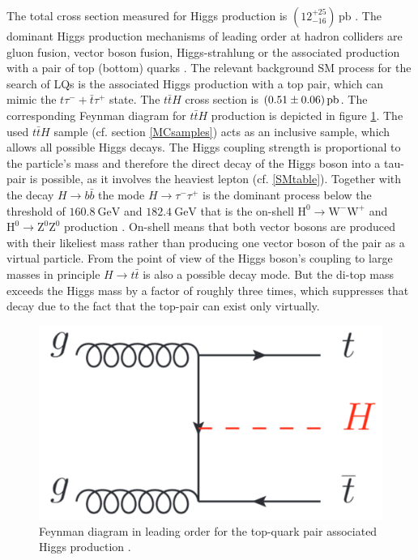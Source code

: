 The total cross section measured for Higgs production is $\left( 12^{+25}_{-16} \right)\,\text{pb}$ \cite{HiggsCrossSection}. The dominant Higgs production mechanisms of leading order at hadron colliders are gluon fusion, vector boson fusion, Higgs-strahlung or the associated production with a pair of top (bottom) quarks \cite{PhysRevD}. The relevant background SM process for the search of LQs is the associated Higgs production with a top pair, which can mimic the $t\tau^{-}+\bar{t}\tau^{+}$ state. The $t\bar{t}H$ cross section is $\SI{0.51\pm0.06}{\pico\barn}$. The corresponding Feynman diagram for $t\bar{t}H$ production is depicted in figure \ref{ttHproduction}. The used $t\bar{t}H$ sample (cf. section \ref{MCsamples}) acts as an inclusive sample, which allows all possible Higgs decays. The Higgs coupling strength is proportional to the particle's mass and therefore the direct decay of the Higgs boson into a tau-pair is possible, as it involves the heaviest lepton (cf. \ref{SMtable}). Together with the decay $H\rightarrow b\bar{b}$ the mode $H\rightarrow \tau^-\tau^+$ is the dominant process below the threshold of $\SI{160.8}{\giga\electronvolt}$ and $\SI{182.4}{\giga\electronvolt}$ that is the on-shell $\text{H}^0\rightarrow\text{W}^-\text{W}^+$ and $\text{H}^0\rightarrow\text{Z}^0\text{Z}^0$ production \cite{PhysRevD}. On-shell means that both vector bosons are produced with their likeliest mass rather than producing one vector boson of the pair as a virtual particle. From the point of view of the Higgs boson's coupling to large masses in principle $H\rightarrow t\bar{t}$ is also a possible decay mode. But the di-top mass exceeds the Higgs mass by a factor of roughly three times, which suppresses that decay due to the fact that the top-pair can exist only virtually.    
%
\begin{figure}[htbp]                                 
 \begin{center}                                       
  \includegraphics[width=0.3\linewidth]{figures/ttHproduction.pdf} 
   \caption[Higgs production associated with a top-quark pair.]{Feynman diagram in leading order for the top-quark pair associated Higgs production \cite{PhysRevD}.}
  \label{ttHproduction}                                    
 \end{center}
\end{figure}
